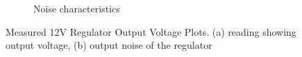 \begin{figure}
\begin{subfigure}[]{0.45\textwidth}
		    \caption{Noise characteristics}  \label{subfig:18V}
     \end{subfigure}
   \caption[Measured 12V Regulator Output Voltage Plots]{Measured 12V Regulator Output Voltage Plots. (a) reading showing output voltage, (b) output noise of the regulator}
    \label{fig:buck_converter_results_box}
 \end{figure}








